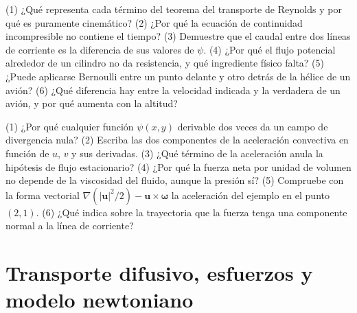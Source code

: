 \documentclass[10pt,openany]{book}
\begin{document}
\begin{tcolorbox}[title={Autoevaluación}, studiumcheck, breakable]

(1) ¿Qué representa cada término del teorema del transporte de Reynolds y por qué es puramente cinemático? (2) ¿Por qué la ecuación de continuidad incompresible no contiene el tiempo? (3) Demuestre que el caudal entre dos líneas de corriente es la diferencia de sus valores de \(\psi\). (4) ¿Por qué el flujo potencial alrededor de un cilindro no da resistencia, y qué ingrediente físico falta? (5) ¿Puede aplicarse Bernoulli entre un punto delante y otro detrás de la hélice de un avión? (6) ¿Qué diferencia hay entre la velocidad indicada y la verdadera de un avión, y por qué aumenta con la altitud?

(1) ¿Por qué cualquier función \(\psi(x, y)\) derivable dos veces da un campo de divergencia nula? (2) Escriba las dos componentes de la aceleración convectiva en función de \(u\), \(v\) y sus derivadas. (3) ¿Qué término de la aceleración anula la hipótesis de flujo estacionario? (4) ¿Por qué la fuerza neta por unidad de volumen no depende de la viscosidad del fluido, aunque la presión sí? (5) Compruebe con la forma vectorial \(\nabla(|\mathbf{u}|^{2}/2) - \mathbf{u}\times\boldsymbol{\omega}\) la aceleración del ejemplo en el punto \((2, 1)\). (6) ¿Qué indica sobre la trayectoria que la fuerza tenga una componente normal a la línea de corriente?
\end{tcolorbox}
\studiumchaptercheck

\chapter{Transporte difusivo, esfuerzos y modelo newtoniano}
\label{chap:c13}

\end{document}
